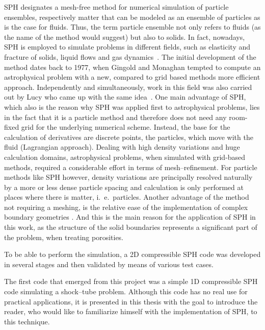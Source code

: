 \documentclass[11pt,a4paper,twoside]{report}
\begin{document}
SPH designates a mesh-free method for numerical simulation of particle
ensembles, respectively matter that can be modeled as an ensemble of
particles as is the case for fluids.
Thus, the term particle ensemble not only refers
to fluids (as the name of the method would suggest) but also to solids. In
fact, nowadays, SPH is employed to simulate problems in different fields,
such as elasticity and fracture of solids, liquid flows and gas
dynamics~\cite{Monaghan2005}.
The initial development of the method dates back to 1977, when Gingold and
Monaghan \cite{Gingold1977} tempted to compute an astrophysical %
problem with a new, compared to grid based methods more efficient approach. Independently and simultaneously, work in this field was also carried out by Lucy who came up with the same idea~\cite{Lucy1977}. One main advantage of SPH, which also is the reason why SPH was applied first to astrophysical problems, lies in the fact that it is a particle method and therefore does not need any room-fixed grid for the underlying numerical scheme. Instead, the base for the calculation of derivatives are discrete points, the particles, which move with the fluid (Lagrangian approach). Dealing with high density variations and huge calculation domains, astrophysical problems, when simulated with grid-based methods, 
required a considerable effort in terms of mesh--refinement. For particle methods like SPH however, density variations are principally resolved naturally by a more or less dense particle spacing and calculation is only performed at places where there is matter, i.\ e.\ particles.
Another advantage of the method not requiring a meshing, is the relative ease of the implementation of complex boundary geometries \cite{Adams2010}. And this is the main reason for the application of SPH in this work, as the structure of the solid boundaries represents a significant part of the problem, when treating porosities.


 
To be able to perform the simulation, a 2D compressible SPH code was developed in several stages and then validated by means of various test cases.

The first code that emerged from this project was a simple 1D compressible SPH code simulating a shock--tube problem. Although this code has no real use for practical applications, it is presented in this thesis with the goal to introduce the reader, who would like to familiarize himself with the implementation of SPH, to this technique.
\end{document}
